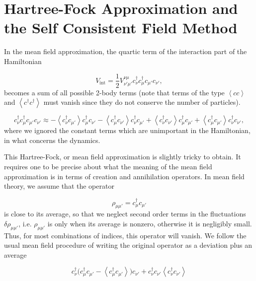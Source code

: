 \chapter{Hartree-Fock Approximation and the Self Consistent Field Method}
\label{ap:hartree-fock}

\pagebreak

In the mean field approximation, the quartic term of the interaction part of the Hamiltonian

\begin{equation*}
V_{\text{int}} = \frac{1}{2} V^{\nu\mu}_{\nu'\mu'} c_\nu^\dagger c_\mu^\dagger c_{\mu'} c_{\nu'} ,
\end{equation*} 
becomes a sum of all possible 2-body terms (note that terms of the type $\left\langle cc \right\rangle$ and $\left\langle c^\dagger c^\dagger \right\rangle$ must vanish since they do not conserve the number of particles).

\begin{equation}\label{eq:c_mft}
c_\nu^\dagger c_\mu^\dagger c_{\mu'} c_{\nu'} \approx - \left\langle c_\nu^\dagger c_{\mu'} \right\rangle  c_{\mu}^\dagger c_{\nu'} - \left\langle c_{\mu}^\dagger c_{\nu'} \right\rangle c_{\nu}^\dagger c_{\mu'} + \left\langle c_{\nu}^\dagger c_{\nu'} \right\rangle  c_{\mu}^\dagger c_{\mu'} + \left\langle c_{\mu}^\dagger c_{\mu'} \right\rangle  c_{\nu}^\dagger c_{\nu'} ,
\end{equation}
where we ignored the constant terms which are unimportant in the Hamiltonian, in what concerns the dynamics. 

This Hartree-Fock, or mean field approximation is slightly tricky to obtain. It requires one to be precise about what the meaning of the mean field approximation is in terms of creation and annihilation operators. In mean field theory, we assume that the operator

\begin{equation}
\rho_{\mu\mu'} = c_{\mu}^\dagger c_{\mu'}
\end{equation}
is close to its average, so that we neglect second order terms in the fluctuations $\delta \rho_{\mu\mu'}$, i.e. $\rho_{\mu\mu'}$ is  only when its average is nonzero, otherwise it is negligibly small. Thus, for most combinations of indices, this operator will vanish. We follow the usual mean field procedure of writing the original operator as a deviation plus an average

\begin{equation}\label{eq:hartree}
c_{\nu}^\dagger \bigg( c_\mu^\dagger c_{\mu'} - \left\langle c_\mu^\dagger c_{\mu'} \right\rangle \bigg) c_{\nu'} + c_{\nu}^\dagger c_{\nu'} \left\langle c_\nu^\dagger c_{\nu'} \right\rangle
\end{equation}

